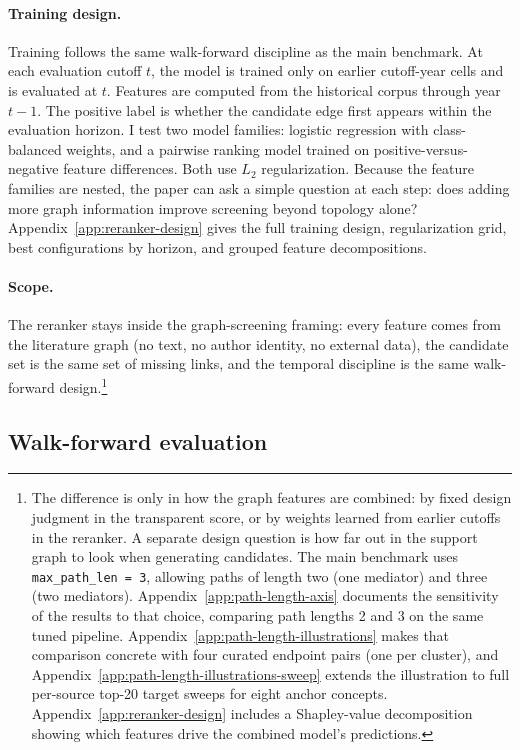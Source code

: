 \documentclass[11pt]{article}
\begin{document}
\paragraph{Training design.}
Training follows the same walk-forward discipline as the main benchmark. At each evaluation cutoff \(t\), the model is trained only on earlier cutoff-year cells and is evaluated at \(t\). Features are computed from the historical corpus through year \(t-1\). The positive label is whether the candidate edge first appears within the evaluation horizon. I test two model families: logistic regression with class-balanced weights, and a pairwise ranking model trained on positive-versus-negative feature differences. Both use \(L_2\) regularization. Because the feature families are nested, the paper can ask a simple question at each step: does adding more graph information improve screening beyond topology alone? Appendix~\ref{app:reranker-design} gives the full training design, regularization grid, best configurations by horizon, and grouped feature decompositions.

\paragraph{Scope.}
The reranker stays inside the graph-screening framing: every feature comes from the literature graph (no text, no author identity, no external data), the candidate set is the same set of missing links, and the temporal discipline is the same walk-forward design.\footnote{The difference is only in how the graph features are combined: by fixed design judgment in the transparent score, or by weights learned from earlier cutoffs in the reranker. A separate design question is how far out in the support graph to look when generating candidates. The main benchmark uses \texttt{max\_path\_len = 3}, allowing paths of length two (one mediator) and three (two mediators). Appendix~\ref{app:path-length-axis} documents the sensitivity of the results to that choice, comparing path lengths 2 and 3 on the same tuned pipeline. Appendix~\ref{app:path-length-illustrations} makes that comparison concrete with four curated endpoint pairs (one per cluster), and Appendix~\ref{app:path-length-illustrations-sweep} extends the illustration to full per-source top-20 target sweeps for eight anchor concepts. Appendix~\ref{app:reranker-design} includes a Shapley-value decomposition showing which features drive the combined model's predictions.}

\subsection{Walk-forward evaluation}
\end{document}
